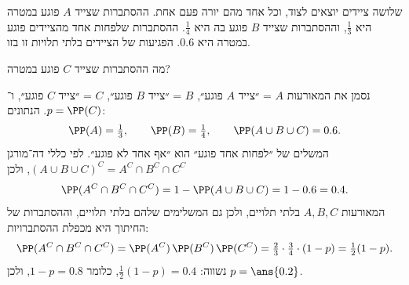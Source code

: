 שלושה ציידים יוצאים לצוד, וכל אחד מהם יורה פעם אחת. ההסתברות שצייד $A$ פוגע במטרה היא $\frac13$, וההסתברות שצייד $B$ פוגע בה היא $\frac14$. ההסתברות שלפחות אחד מהציידים פוגע במטרה היא $0.6$. הפגיעות של הציידים בלתי תלויות זו בזו.

מה ההסתברות שצייד $C$ פוגע במטרה?
\begin{solbox}
נסמן את המאורעות $A$ = ״צייד $A$ פוגע״, $B$ = ״צייד $B$ פוגע״, $C$ = ״צייד $C$ פוגע״, ו־$p=\PP(C)$. הנתונים:
\[
\PP(A)=\tfrac13,\qquad \PP(B)=\tfrac14,\qquad \PP(A\cup B\cup C)=0.6.
\]
המשלים של ״לפחות אחד פוגע״ הוא ״אף אחד לא פוגע״. לפי כללי דה־מורגן $(A\cup B\cup C)^C=A^C\cap B^C\cap C^C$, ולכן
\[
\PP(A^C\cap B^C\cap C^C)=1-\PP(A\cup B\cup C)=1-0.6=0.4.
\]
המאורעות $A,B,C$ בלתי תלויים, ולכן גם המשלימים שלהם בלתי תלויים, וההסתברות של החיתוך היא מכפלת ההסתברויות:
\[
\PP(A^C\cap B^C\cap C^C)=\PP(A^C)\,\PP(B^C)\,\PP(C^C)=\tfrac23\cdot\tfrac34\cdot(1-p)=\tfrac12(1-p).
\]
נשווה: $\frac12(1-p)=0.4$, כלומר $1-p=0.8$, ולכן $p=\ans{0.2}$.
\end{solbox}
